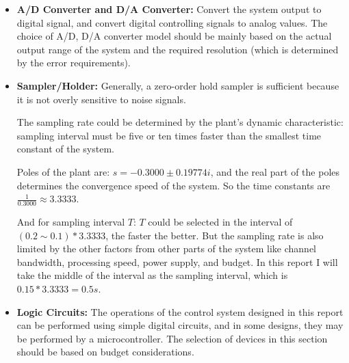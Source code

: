 \documentclass[12pt, oneside]{article}
\begin{document}
\begin{itemize}
    \item \textbf{A/D Converter and D/A Converter:} Convert the system output to digital signal, and convert digital controlling signals to analog values. The choice of A/D, D/A converter model should be mainly based on the actual output range of the system and the required resolution (which is determined by the error requirements).
    \item \textbf{Sampler/Holder:} Generally, a zero-order hold sampler is sufficient because it is not overly sensitive to noise signals. 
    
    The sampling rate could be determined by the plant's dynamic characteristic: sampling interval must be five or ten times faster than the smallest time constant of the system.
    
    Poles of the plant are: $s=-0.3000\pm0.19774i$, and the real part of the poles determines the convergence speed of the system. So the time constants are $\frac{1}{0.3000}\approx3.3333$.

    And for sampling interval $T$: $T$ could be selected in the interval of $(0.2\sim0.1)*3.3333$, the faster the better. But the sampling rate is also limited by the other factors from other parts of the system like channel bandwidth, processing speed, power supply, and budget. In this report I will take the middle of the interval as the sampling interval, which is $0.15*3.3333 = 0.5 s$.
    
    \item \textbf{Logic Circuits:} The operations of the control system designed in this report can be performed using simple digital circuits, and in some designs, they may be performed by a microcontroller. The selection of devices in this section should be based on budget considerations.


\end{itemize}
\end{document}
